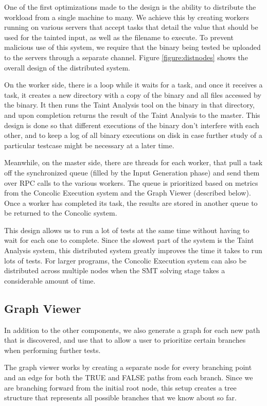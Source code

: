 One of the first optimizations made to the design is the ability to distribute
the workload from a single machine to many. We achieve this by creating workers
running on various servers that accept tasks that detail the value that should
be used for the tainted input, as well as the filename to execute. To prevent
malicious use of this system, we require that the binary being tested be
uploaded to the servers through a separate channel. Figure
\ref{figure:distnodes} shows the overall design of the distributed system.

On the worker side, there is a loop while it waits for a task, and once it
receives a task, it creates a new directory with a copy of the binary and all
files accessed by the binary. It then runs the Taint Analysis tool on the binary
in that directory, and upon completion returns the result of the Taint Analysis
to the master. This design is done so that different executions of the binary
don't interfere with each other, and to keep a log of all binary executions on
disk in case further study of a particular testcase might be necessary at a
later time.

Meanwhile, on the master side, there are threads for each worker, that pull a
task off the synchronized queue (filled by the Input Generation phase) and send
them over RPC calls to the various workers. The queue is prioritized based on
metrics from the Concolic Execution system and the Graph Viewer (described
below). Once a worker has completed its task, the results are stored in another
queue to be returned to the Concolic system.

This design allows us to run a lot of tests at the same time without having to
wait for each one to complete. Since the slowest part of the system is the Taint
Analysis system, this distributed system greatly improves the time it takes to
run lots of tests. For larger programs, the Concolic Execution system can also
be distributed across multiple nodes when the SMT solving stage takes a
considerable amount of time.

\subsection{Graph Viewer}
In addition to the other components, we also generate a graph for each new path
that is discovered, and use that to allow a user to prioritize certain branches
when performing further tests.

The graph viewer works by creating a separate node for every branching point and
an edge for both the TRUE and FALSE paths from each branch. Since we are
branching forward from the initial root node, this setup creates a tree
structure that represents all possible branches that we know about so far.

